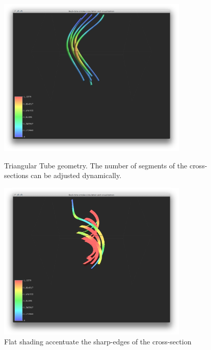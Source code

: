 \begin{figure}[htbp]
\centering
\begin{minipage}[t]{0.48\textwidth}
        \includegraphics[height=3in]{figures/streamtubes/40threeSegments.png}
\caption{Triangular Tube geometry. The number of segments of the cross-sections can be adjusted dynamically.}
\label{fig:trangTubes}
\end{minipage}\hspace{.04\textwidth}%
\begin{minipage}[t]{0.48\textwidth}
        \includegraphics[height=3in]{figures/streamtubes/41flatshading.png}
    \caption{Flat shading accentuate the sharp-edges of the cross-section}
    \label{fig:shadedtubes}
\end{minipage}
\end{figure}

